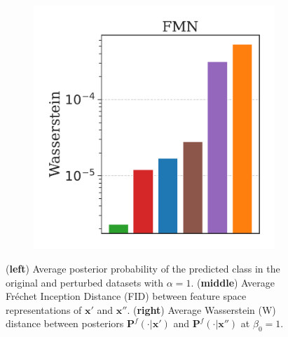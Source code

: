 \begin{figure}[H]
\begin{subfigure}[b]{0.23\textwidth}
        \includegraphics[width=\textwidth]{img/results_discussion/adversarial/W_barplot_FMN_300.pdf}
    \end{subfigure}

    \caption{(\textbf{left}) Average posterior probability of the predicted class in the original and perturbed
    datasets with $\alpha = 1$. (\textbf{middle}) Average Fr\'echet Inception Distance (FID) between feature space 
    representations of $\bm{x}'$ and $\bm{x}''$. (\textbf{right}) Average Wasserstein (W) distance between posteriors
    $\mathbf{P}^f(\cdot | \bm{x'})$ and $\mathbf{P}^f(\cdot | \bm{x''})$ at $\beta_0 = 1$. 
    }
    \label{fig:adv_metric_comparison}
\end{figure}

